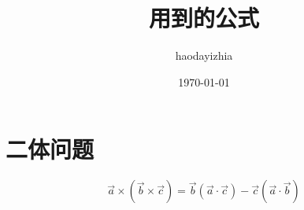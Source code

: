 \documentclass[UTF8]{ctexart}
\title{用到的公式}
\author{haodayizhia}
\date{\today}
\begin{document}
\maketitle
\tableofcontents
\section{二体问题}
\begin{equation}
\vec{a}\times(\vec{b}\times\vec c) =\vec{b}(\vec{a}\cdot\vec{c})-\vec{c}(\vec{a}\cdot\vec{b})
\end{equation}

\end{document}
